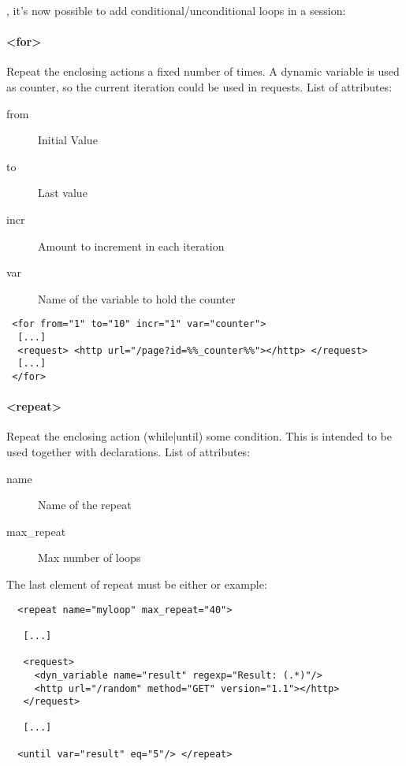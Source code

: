 \documentclass{TSUNG-en}
\begin{document}
, it's now possible to add conditional/unconditional loops in a session:

\paragraph{<for>}


Repeat the enclosing actions a fixed number of times. A dynamic
variable is used as counter, so the current iteration could be used in
requests. List of attributes:

\begin{description}
\item[from] Initial Value
\item[to]   Last value
\item[incr] Amount to increment in each iteration
\item[var]  Name of the variable to hold the counter
\end{description}

\begin{Verbatim}
 <for from="1" to="10" incr="1" var="counter">
  [...]
  <request> <http url="/page?id=%%_counter%%"></http> </request>
  [...]
 </for>
\end{Verbatim}

\paragraph{<repeat>}
Repeat the enclosing action (while|until) some condition. This is
intended to be used together with  declarations. List of
attributes:

\begin{description}
\item[name] Name of the repeat
\item[max\_repeat] Max number of loops
\end{description}

The last element of repeat must be either  or  example:
\begin{Verbatim}
  <repeat name="myloop" max_repeat="40">

   [...]

   <request>
     <dyn_variable name="result" regexp="Result: (.*)"/>
     <http url="/random" method="GET" version="1.1"></http>
   </request>

   [...]

  <until var="result" eq="5"/> </repeat>
\end{Verbatim}
\end{document}
